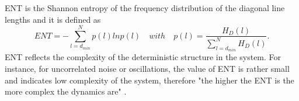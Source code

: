 ENT is the Shannon entropy of the frequency distribution of the diagonal line lengths and
it is defined as
\begin{equation}
ENT= - \sum^{N}_{l=d_{min}} p(l) ln p(l) \quad with \quad p(l)=\frac{ H_D(l) }{ \sum^{N}_{ l=d_{min} } H_D(l) }.
\end{equation}
ENT reflects the complexity of the deterministic structure in the system.
For instance, for uncorrelated noise or oscillations, 
the value of ENT is rather small and indicates low complexity of the system,
therefore "the higher the ENT is the more complex the dynamics are" \cite{marwan2007, marwan2015}.
%
%

 

